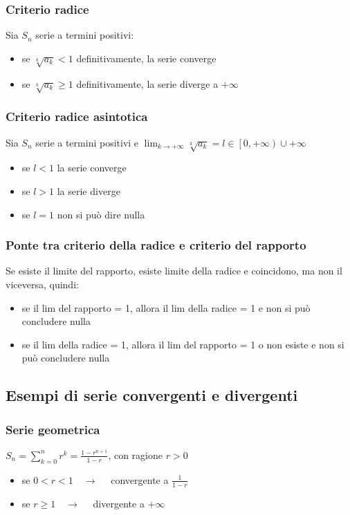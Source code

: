\documentclass[a4paper]{article}
\begin{document}
\subsubsection*{Criterio radice}
Sia \(S_n\) serie a termini positivi:
\begin{itemize}
	\item se \(\sqrt[k]{a_k} < 1\) definitivamente, la serie converge
	\item se \(\sqrt[k]{a_k} \geq 1\) definitivamente, la serie diverge a \(+ \infty\)
\end{itemize}

\subsubsection*{Criterio radice asintotica}
Sia \(S_n\) serie a termini positivi e \(\displaystyle \lim_{k \to +\infty} \sqrt[k]{a_k} = l \in \left[0, +\infty \right) \cup +\infty \)
\begin{itemize}
	\item se \(l < 1\) la serie converge
	\item se \(l > 1\) la serie diverge
	\item se \(l = 1\) non si può dire nulla
\end{itemize}

\subsubsection*{Ponte tra criterio della radice e criterio del rapporto}
Se esiste il limite del rapporto, esiste limite della radice e coincidono, ma non il viceversa, quindi:
\begin{itemize}
	\item se il lim del rapporto = 1, allora il lim della radice = 1 e non si può concludere nulla
	\item se il lim della radice = 1, allora il lim del rapporto = 1 o non esiste e non si può concludere nulla
\end{itemize}

\newpage

\subsection{Esempi di serie convergenti e divergenti}
\subsubsection*{Serie geometrica}
\(\displaystyle S_n = \sum_{k = 0}^{n} r ^ k = \frac{1-r^{n+1}}{1-r}\), con ragione \(r > 0\)
\begin{itemize}
	\item se \(0 < r < 1 \quad \rightarrow \quad\) convergente a \(\frac{1}{1-r}\)
	\item se \(r \geq 1 \quad \rightarrow \quad\) divergente a \(+ \infty\)
\end{itemize}
\end{document}
